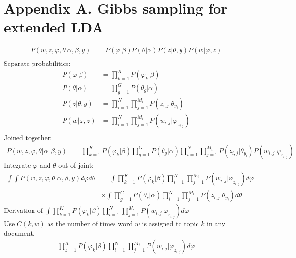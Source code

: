 \section{Appendix A. Gibbs sampling for extended LDA}\label{ref:derivation}
\begin{align}
P(w, z, \varphi, \theta | \alpha, \beta, y) &= P(\varphi | \beta)P(\theta | \alpha)P(z | \theta, y)P(w | \varphi, z)\\
\end{align}
Separate probabilities:
\begin{align}
P(\varphi | \beta) &= \prod\limits_{k=1}^K P(\varphi_k|\beta)\\
P(\theta | \alpha) &= \prod\limits_{g=1}^G P(\theta_g|\alpha)\\
P(z | \theta, y) &= \prod\limits_{i=1}^N \prod\limits_{j=1}^{M_i} P(z_{i,j}|\theta_{y_i})\\
P(w | \varphi, z) &= \prod\limits_{i=1}^N \prod\limits_{j=1}^{M_i} P(w_{i,j}|\varphi_{z_{i,j}})\\
\end{align}
Joined together:
\begin{align}
P(w, z, \varphi, \theta | \alpha, \beta, y) &= \prod\limits_{k=1}^K P(\varphi_k|\beta) \prod\limits_{g=1}^G P(\theta_g|\alpha) \prod^N_{i=1}\prod^{M_i}_{j=1} P(z_{i,j}|\theta_{y_i}) P(w_{i,j}|\varphi_{z_{i,j}})
\end{align}
Integrate $\varphi$ and $\theta$ out of joint:
\begin{align}
\int \int P(w, z, \varphi, \theta | \alpha, \beta, y) d\varphi d\theta &= \int \prod\limits_{k=1}^K P(\varphi_k|\beta) \prod^N_{i=1}\prod^{M_i}_{j=1} P(w_{i,j}|\varphi_{z_{i,j}}) d\varphi\\
&\times \int \prod\limits_{g=1}^G P(\theta_g|\alpha) \prod^N_{i=1}\prod^{M_i}_{j=1} P(z_{i,j}|\theta_{y_i}) d\theta
\end{align}
Derivation of $\int \prod\limits_{k=1}^K P(\varphi_k|\beta) \prod^N_{i=1}\prod^{M_i}_{j=1} P(w_{i,j}|\varphi_{z_{i,j}}) d\varphi$
~\\Use $C(k,w)$ as the number of times word $w$ is assigned to topic $k$ in any document.
\begin{align}
\prod\limits_{k=1}^K P(\varphi_k|\beta) \prod^N_{i=1}\prod^{M_i}_{j=1} P(w_{i,j}|\varphi_{z_{i,j}}) d\varphi
\end{align}
